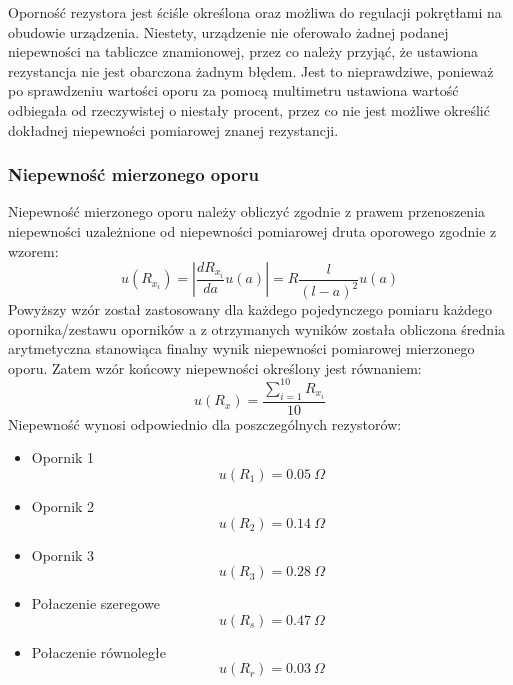 \documentclass[a4paper,12pts]{article}
\begin{document}
Oporność rezystora jest ściśle określona oraz możliwa do regulacji pokrętłami na obudowie urządzenia. Niestety, urządzenie nie oferowało żadnej podanej niepewności na tabliczce znamionowej, przez co należy przyjąć, że ustawiona rezystancja nie jest obarczona żadnym błędem. Jest to nieprawdziwe, ponieważ po sprawdzeniu wartości oporu za pomocą multimetru ustawiona wartość odbiegała od rzeczywistej o niestały procent, przez co nie jest możliwe określić dokładnej niepewności pomiarowej znanej rezystancji.


\subsubsection{Niepewność mierzonego oporu}

Niepewność mierzonego oporu należy obliczyć zgodnie z prawem przenoszenia niepewności uzależnione od niepewności pomiarowej druta oporowego zgodnie z wzorem:
\begin{equation}
u(R_{{x}_i}) = \left| \frac{dR_{{x}_i}}{da} u(a) \right| = R \frac{l}{(l-a)^2} u(a)
\end{equation}
Powyższy wzór został zastosowany dla każdego pojedynczego pomiaru każdego opornika/zestawu oporników a z otrzymanych wyników została obliczona średnia arytmetyczna stanowiąca finalny wynik niepewności pomiarowej mierzonego oporu. Zatem wzór końcowy niepewności określony jest równaniem:
\begin{equation}
u(R_x) = \frac{\sum_{i = 1}^{10} R_{{x}_i}}{10}
\end{equation}
Niepewność wynosi odpowiednio dla poszczególnych rezystorów:
\begin{itemize}
	\item Opornik 1
	\begin{equation}
	u(R_1) = 0.05~\Omega
	\end{equation}
	
	\item Opornik 2
	\begin{equation}
	u(R_2) = 0.14~\Omega
	\end{equation}
	
	\item Opornik 3
	\begin{equation}
	u(R_3) = 0.28~\Omega
	\end{equation}
	
	\item Połaczenie szeregowe
	\begin{equation}
	u(R_s) = 0.47~\Omega
	\end{equation}
	
	\item Połaczenie równoległe
	\begin{equation}
	u(R_r) = 0.03~\Omega
	\end{equation}
\end{itemize}
\end{document}
